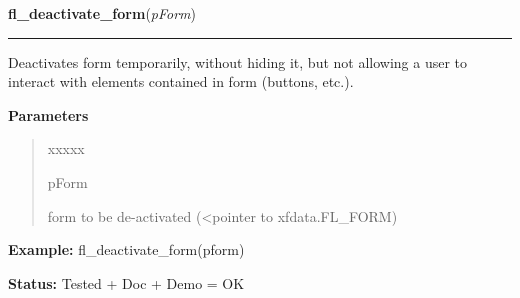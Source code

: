 \hspace{.8\funcindent}\begin{boxedminipage}{\funcwidth}

    \raggedright \textbf{fl\_deactivate\_form}(\textit{pForm})

    \vspace{-1.5ex}

    \rule{\textwidth}{0.5\fboxrule}
\setlength{\parskip}{2ex}
    Deactivates form temporarily, without hiding it, but not allowing a 
    user to interact with elements contained in form (buttons, etc.).

\setlength{\parskip}{1ex}
      \textbf{Parameters}
      \vspace{-1ex}

      \begin{quote}
        \begin{Ventry}{xxxxx}

          \item[pForm]

          form to be de-activated ({\textless}pointer to xfdata.FL\_FORM)

        \end{Ventry}

      \end{quote}

\textbf{Example:} fl\_deactivate\_form(pform)



\textbf{Status:} Tested + Doc + Demo = OK



    \end{boxedminipage}

    \label{xformslib:library:fl_activate_form}

    \vspace{0.5ex}

